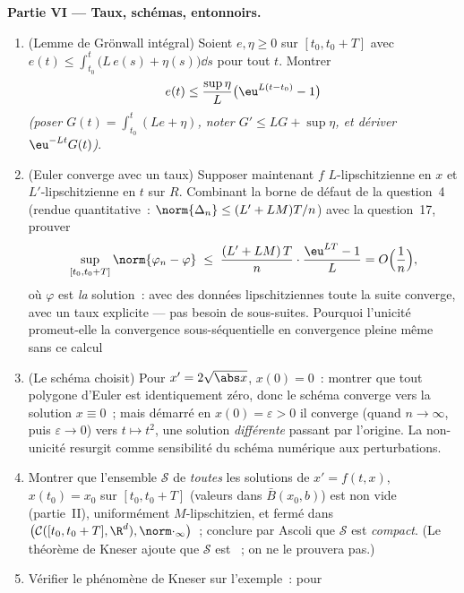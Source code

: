 \begin{problem}[{Problème de fin de semaine --- existence de
solutions de $x' = f(t, x)$ sans Lipschitz}]
\medskip
\noindent\textbf{Partie VI --- Taux, schémas, entonnoirs.}
\begin{enumerate}[resume]
  \item (Lemme de Grönwall intégral) Soient $e, \eta \geq 0$
         sur $[t_0, t_0+T]$ avec $e(t) \leq
        \int_{t_0}^t\bigl(L\,e(s) + \eta(s)\bigr)\dd s$ pour
        tout $t$. Montrer
        \[
        e(t) \leq \frac{\sup\eta}{L}\bigl(\eu^{L(t - t_0)} -
        1\bigr)
        \]
        \emph{(poser $G(t) = \int_{t_0}^t(Le + \eta)$, noter
        $G' \leq LG + \sup\eta$, et dériver
        $\eu^{-Lt}G(t)$)}.
  \item (Euler converge avec un taux) Supposer maintenant $f$
        $L$-lipschitzienne en $x$ et $L'$-lipschitzienne en
        $t$ sur $R$. Combinant la borne de défaut de la
        question~4 (rendue quantitative~: $\norm{\Delta_n}
        \leq (L' + LM)T/n$) avec la question~17, prouver
        \[
        \sup_{[t_0, t_0+T]}\norm{\varphi_n - \varphi}
        \;\leq\; \frac{(L' + LM)\,T}{n}\cdot
        \frac{\eu^{LT} - 1}{L} = O\Bigl(\frac1n\Bigr),
        \]
        où $\varphi$ est \emph{la} solution~: avec des données
        lipschitziennes toute la suite converge, avec un taux
        explicite --- pas besoin de sous-suites. Pourquoi
        l'unicité promeut-elle la convergence sous-séquentielle
        en convergence pleine même sans ce calcul~
  \item (Le schéma choisit) Pour $x' = 2\sqrt{\abs x}$, $x(0) =
        0$~: montrer que tout polygone d'Euler est
        identiquement zéro, donc le schéma converge vers la
        solution $x \equiv 0$~; mais démarré en $x(0) =
        \varepsilon > 0$ il converge (quand $n \to \infty$,
        puis $\varepsilon \to 0$) vers $t \mapsto t^2$, une
        solution \emph{différente} passant par l'origine. La
        non-unicité resurgit comme sensibilité du schéma
        numérique aux perturbations.
  \item Montrer que l'ensemble $\mathcal S$ de \emph{toutes}
        les solutions de $x' = f(t,x)$, $x(t_0) = x_0$ sur
        $[t_0, t_0+T]$ (valeurs dans $\bar B(x_0, b)$) est non
        vide (partie~II), uniformément $M$-lipschitzien, et
        fermé dans $\bigl(\mathcal C([t_0, t_0+T], \R^d),
        \norm\cdot_\infty\bigr)$~; conclure par Ascoli que
        $\mathcal S$ est \emph{compact}. (Le théorème de
        Kneser ajoute que $\mathcal S$ est ~; on ne le
        prouvera pas.)
  \item Vérifier le phénomène de Kneser sur l'exemple~: pour

\end{enumerate}
\end{problem}
